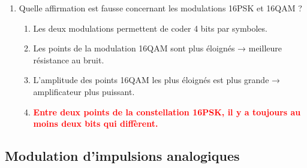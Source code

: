\documentclass[a4paper]{article}
\begin{document}
\begin{enumerate}[label=Q\arabic*.]
\item Quelle affirmation est fausse concernant les modulations 16PSK et 16QAM ?
\begin{enumerate}
    \item Les deux modulations permettent de coder 4 bits par symboles.
    \item Les points de la modulation 16QAM sont plus éloignés → meilleure résistance au bruit.
    \item L'amplitude des points 16QAM les plus éloignés est plus grande → amplificateur plus puissant.
    \item \textcolor{red}{\textbf{Entre deux points de la constellation 16PSK, il y a toujours au moins deux bits qui diffèrent.}}
\end{enumerate}


\end{enumerate}










\subsection{Modulation d'impulsions analogiques}
\end{document}
